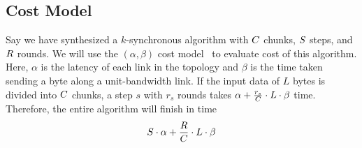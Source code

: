 \subsection{Cost Model}
\label{sec:costmodel}
Say we have synthesized a $k$-synchronous algorithm with $C$ chunks, $S$ steps, and $R$ rounds. 
We will use the $(\alpha, \beta)$ cost model~\cite{hockney1994communication} to evaluate cost of this algorithm. 
Here, $\alpha$ is the latency of each link in the topology and $\beta$ is the time taken sending a byte along a unit-bandwidth link. 
If the input data of $L$ bytes is divided into $C$ chunks, a step $s$ with $r_s$ rounds takes $\alpha + \frac{r_s}{C}\cdot L \cdot \beta$ time. Therefore, the entire algorithm will finish in time
$$ S \cdot \alpha + \frac{R}{C} \cdot L \cdot \beta $$

